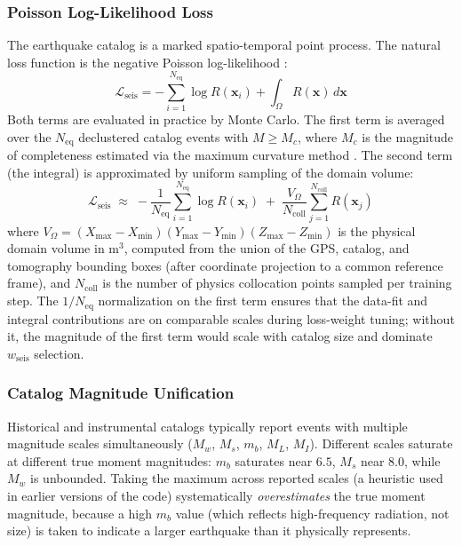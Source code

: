 \documentclass[11pt, a4paper]{article}
\begin{document}
\subsubsection{Poisson Log-Likelihood Loss}
The earthquake catalog is a marked spatio-temporal point process. The natural loss function is the negative Poisson log-likelihood \cite{Ogata1998}:
\begin{equation}
    \mathcal{L}_{\text{seis}} = -\sum_{i=1}^{N_{\text{eq}}} \log R(\mathbf{x}_i) + \int_\Omega R(\mathbf{x})\,d\mathbf{x}
    \label{eq:poisson}
\end{equation}
Both terms are evaluated in practice by Monte Carlo. The first term is averaged over the $N_{\text{eq}}$ declustered catalog events with $M \geq M_c$, where $M_c$ is the magnitude of completeness estimated via the maximum curvature method \cite{Wiemer2000}. The second term (the integral) is approximated by uniform sampling of the domain volume:
\begin{equation}
    \mathcal{L}_{\text{seis}} \;\approx\; -\frac{1}{N_{\text{eq}}}\sum_{i=1}^{N_{\text{eq}}} \log R(\mathbf{x}_i) \;+\; \frac{V_\Omega}{N_{\text{coll}}} \sum_{j=1}^{N_{\text{coll}}} R(\mathbf{x}_j)
    \label{eq:poisson_mc}
\end{equation}
where $V_\Omega = (X_{\max} - X_{\min})(Y_{\max} - Y_{\min})(Z_{\max} - Z_{\min})$ is the physical domain volume in m$^3$, computed from the union of the GPS, catalog, and tomography bounding boxes (after coordinate projection to a common reference frame), and $N_{\text{coll}}$ is the number of physics collocation points sampled per training step. The $1/N_{\text{eq}}$ normalization on the first term ensures that the data-fit and integral contributions are on comparable scales during loss-weight tuning; without it, the magnitude of the first term would scale with catalog size and dominate $w_{\text{seis}}$ selection.

\subsubsection{Catalog Magnitude Unification}
\label{sec:mag_unif}
Historical and instrumental catalogs typically report events with multiple magnitude scales simultaneously ($M_w$, $M_s$, $m_b$, $M_L$, $M_I$). Different scales saturate at different true moment magnitudes: $m_b$ saturates near $6.5$, $M_s$ near $8.0$, while $M_w$ is unbounded. Taking the maximum across reported scales (a heuristic used in earlier versions of the code) systematically \textit{overestimates} the true moment magnitude, because a high $m_b$ value (which reflects high-frequency radiation, not size) is taken to indicate a larger earthquake than it physically represents.
\end{document}
